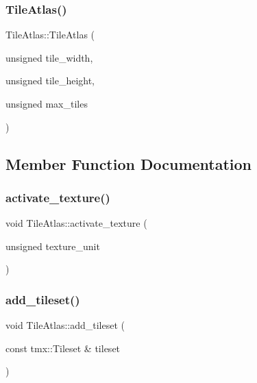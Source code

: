 \subsubsection{\texorpdfstring{Tile\+Atlas()}{TileAtlas()}}
{\footnotesize\ttfamily Tile\+Atlas\+::\+Tile\+Atlas (\begin{DoxyParamCaption}\item[{unsigned}]{tile\+\_\+width,  }\item[{unsigned}]{tile\+\_\+height,  }\item[{unsigned}]{max\+\_\+tiles }\end{DoxyParamCaption})}



\subsection{Member Function Documentation}
\mbox{\label{classpixel_1_1_tile_atlas_a52f01d601f75641fa84661497c3859a1}} 
\subsubsection{\texorpdfstring{activate\+\_\+texture()}{activate\_texture()}}
{\footnotesize\ttfamily void Tile\+Atlas\+::activate\+\_\+texture (\begin{DoxyParamCaption}\item[{unsigned}]{texture\+\_\+unit }\end{DoxyParamCaption})}

\mbox{\label{classpixel_1_1_tile_atlas_afc350aae3a476bdbb59873879173363e}} 
\subsubsection{\texorpdfstring{add\+\_\+tileset()}{add\_tileset()}}
{\footnotesize\ttfamily void Tile\+Atlas\+::add\+\_\+tileset (\begin{DoxyParamCaption}\item[{const tmx\+::\+Tileset \&}]{tileset }\end{DoxyParamCaption})}

